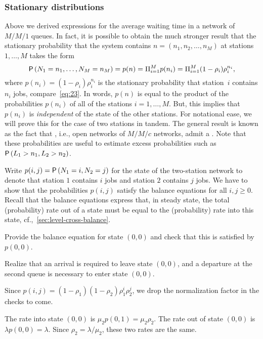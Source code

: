 \documentclass[companion]{subfiles}
\begin{document}
\subsubsection*{Stationary distributions}

Above we derived expressions for the average waiting time in a network of $M/M/1$ queues.
In fact, it is possible to obtain the much stronger result that the stationary probability that the system contains $n=(n_1,n_2, \ldots, n_M)$ at stations $1,\ldots, M$ takes the form
\begin{equation*}
  \P{N_1=n_1, \ldots, N_M=n_M} = p(n) = \Pi_{i=1}^M p(n_i) = \Pi_{i=1}^M (1-\rho_i)\rho_i^{n_i},
\end{equation*}
where $p(n_i)=(1-\rho_i)\rho_i^{n_i}$ is the stationary probability that station~$i$ contains $n_i$ jobs, compare~\cref{eq:23}.
In words, $p(n)$ is equal to the product of the probabilities $p(n_i)$ of all of the stations $i=1,\ldots,M$.
But, this implies that $p(n_i)$ is \emph{independent} of the state of the other stations.
For notational ease, we will prove this for the case of two stations in tandem.
The general result is known as the fact that , i.e., open networks of $M/M/c$ networks, admit a .
Note that these probabilities are useful to estimate excess probabilities such as $\P{L_1> n_1, L_2>n_2}$. 


Write $p(i,j)=\P{N_1=i, N_2=j}$ for the state of the two-station network to denote that station $1$ contains $i$ jobs and station $2$ contains $j$ jobs.
We have to show that the probabilities $p(i,j)$ satisfy the balance equations for all $i, j\geq 0$.
Recall that the balance equations express that, in steady state, the total (probability) rate out of a state must be equal to the (probability) rate into this state, cf.,~\cref{sec:level-cross-balance}.

\begin{extra}
  Provide the balance equation for state $(0,0)$ and check that this is satisfied by $p(0,0)$.
\begin{hint}
  Realize that an arrival is required to leave state $(0,0)$, and a departure at the second queue is necessary to enter state $(0,0)$.
\end{hint}
\begin{solution}
  Since $p(i,j) = (1-\rho_1)(1-\rho_2)\rho_1^i \rho_2^j$, we drop the normalization factor in the checks to come.

  The rate into state $(0,0)$ is $\mu_2 p(0,1) = \mu_2 \rho_2$. The rate out of state $(0,0)$ is $\lambda p(0,0) = \lambda$. Since $\rho_2=\lambda/\mu_2$, these two rates are the same.
\end{solution}
\end{extra}
\end{document}
